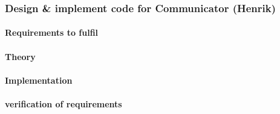 
\subsubsection{Design \& implement code for Communicator (Henrik)}
\paragraph{Requirements to fulfil}


\paragraph{Theory}


\paragraph{Implementation}


\paragraph{verification of requirements}

